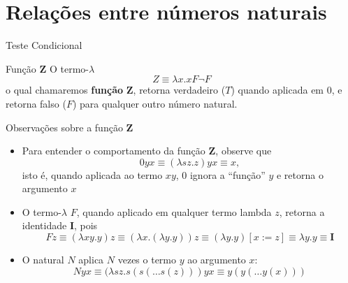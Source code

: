 \section{Relações entre números naturais}

\begin{frame}[fragile]{Teste Condicional}

    \begin{block}{Função $\mathbf{Z}$}
        O termo-$\lambda$
        \[
            Z\equiv \lambda x.xF\lnot F
        \]
        o qual chamaremos \textbf{função} $\mathbf{Z}$, retorna verdadeiro ($T$) quando aplicada
        em $0$, e retorna falso ($F$) para qualquer outro número natural.
    \end{block}

\end{frame}

\begin{frame}[fragile]{Observações sobre a função $\mathbf{Z}$}

    \begin{itemize}
        \item Para entender o comportamento da função $\mathbf{Z}$, observe que
        \[
            0yx \equiv (\lambda sz.z)yx \equiv x,
        \]
        isto é, quando aplicada ao termo $xy$, $0$ ignora a ``função'' $y$ e retorna o argumento
        $x$

        \item O termo-$\lambda$ $F$, quando aplicado em qualquer termo lambda $z$, 
        retorna a identidade $\mathbf{I}$, pois
        \[
            Fz \equiv (\lambda xy.y)z \equiv (\lambda x.(\lambda y.y))z \equiv (\lambda y.y)[x:=z]
                \equiv \lambda y.y \equiv \mathbf{I}
        \]

        \item O natural $N$ aplica $N$ vezes o termo $y$ ao argumento $x$:
        \[
            Nyx \equiv (\lambda sz.s(s(\ldots s(z)))yx \equiv y(y(\ldots y(x)))
        \]
    \end{itemize}

\end{frame}

